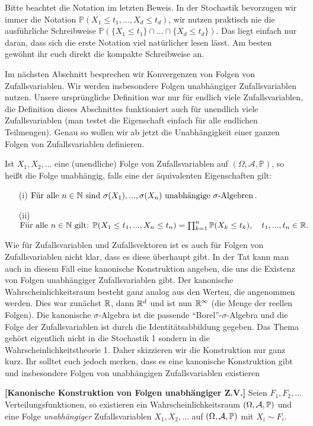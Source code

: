Bitte beachtet die Notation im letzten Beweis. In der Stochastik bevorzugen wir immer die Notation
$\mathbb{P}( X_1 \leq t_1 , ... , X_d \leq t_d)$, wir nutzen praktisch nie die ausf\"uhrliche Schreibweise $\mathbb{P}(\{ X_1 \leq t_1 \} \cap ... \cap \{ X_d \leq t_d \})$. Das liegt einfach nur daran, dass sich die erste Notation viel nat\"urlicher lesen l\"asst. Am besten gew\"ohnt ihr euch direkt die kompakte Schreibweise an.\smallskip

Im n\"achsten Abschnitt besprechen wir Konvergenzen von Folgen von Zufallsvariablen. Wir werden insbesondere Folgen unabh\"angiger Zufallsvariablen nutzen. Unsere urspr\"ungliche Definition war nur f\"ur endlich viele Zufallsvariablen, die Definition dieses Abschnittes funktioniert auch f\"ur unendlich viele Zufallsvariablen (man testet die Eigenschaft einfach f\"ur alle endlichen Teilmengen). Genau so wollen wir ab jetzt die Unabh\"angigkeit einer ganzen Folgen von Zufallsvariablen definieren.
\begin{deff}
	Ist $X_1,X_2,...$ eine (unendliche) Folge von Zufallsvariablen auf $(\Omega, \mathcal A, \mathbb P)$, so hei\ss t die Folge unabh\"angig, falls eine der \"aquivalenten Eigenschaften gilt: 
\begin{itemize}
\item[(i)] $\text{F\"ur alle } n\in\mathbb{N}\text{ sind }\sigma(X_1), ..., \sigma(X_n)\text{ unabh\"angige }\sigma\text{-Algebren}$.
\item[(ii)] $	\text{F\"ur alle } n\in\mathbb{N}\text{ gilt: } \mathbb P(X_1 \leq t_1, ..., X_n\leq t_n)=\prod_{k=1}^n \mathbb P(X_k \leq t_k),\quad t_1,...,t_n\in\mathbb{R}.$
\end{itemize}
\end{deff}
Wie f\"ur Zufallsvariablen und Zufallsvektoren ist es auch f\"ur Folgen von Zufallsvariablen nicht klar, dass es diese \"uberhaupt gibt. In der Tat kann man auch in diesem Fall eine kanonische Konstruktion angeben, die uns die Existenz von Folgen unabh\"angiger Zufallsvariablen gibt. Der kanonische Wahrscheinlichkeitsraum besteht ganz analog aus den Werten, die angenommen werden. Dies war zun\"achst $\mathbb{R}$, dann $\mathbb{R}^d$ und ist nun $\mathbb{R}^\infty$ (die Menge der reellen Folgen). Die kanonische $\sigma$-Algebra ist die passende \enquote{Borel}-$\sigma$-Algebra und die Folge der Zufallsvariablen ist durch die Identit\"atsabbildung gegeben. Das Thema geh\"ort eigentlich nicht in die Stochastik 1 sondern in die Wahrscheinlichkeitstheorie 1. Daher skizzieren wir die Konstruktion nur ganz kurz. Ihr solltet euch jedoch merken, dass es eine kanonische Konstruktion gibt und insbesondere Folgen von unabh\"angigen Zufallsvariablen existieren
\begin{satz}\label{Folge}
 \textbf{[Kanonische Konstruktion von Folgen unabhängiger Z.V.]}
	Seien $F_1,F_2,...$ Verteilungsfunktionen, so existieren ein Wahrscheinlichkeitsraum $(\Omega, \mathcal{A}, \mathbb{P})$ und eine Folge \textit{unabhängiger} Zufallsvariablen $X_1,X_2,...$ auf $(\Omega, \mathcal{A}, \mathbb{P})$ mit $X_i \sim F_i$.
\end{satz}


